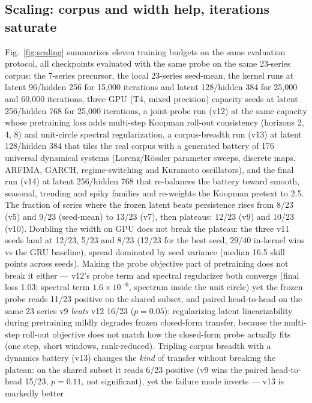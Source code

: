 \documentclass[11pt]{article}
\begin{document}
\subsection{Scaling: corpus and width help, iterations saturate}
\label{sec:scaling}
Fig.~\ref{fig:scaling} summarizes eleven training budgets on the same
evaluation protocol, all checkpoints evaluated with the same probe on the
same 23-series corpus: the 7-series precursor, the local 23-series
seed-mean, the kernel runs at latent 96/hidden 256 for 15{,}000
iterations and latent 128/hidden 384 for 25{,}000 and 60{,}000
iterations, three GPU (T4, mixed precision) capacity seeds at latent
256/hidden 768 for 25{,}000 iterations, a joint-probe run (v12) at
the same capacity whose pretraining loss adds multi-step Koopman
roll-out consistency (horizons 2, 4, 8) and unit-circle spectral
regularization, a corpus-breadth run (v13) at latent 128/hidden
384 that tiles the real corpus with a generated battery of 176
universal dynamical systems (Lorenz/R\"ossler parameter sweeps,
discrete maps, ARFIMA, GARCH, regime-switching and Kuramoto
oscillators), and the final run (v14) at latent 256/hidden 768 that
re-balances the battery toward smooth, seasonal, trending and spiky
families and re-weights the Koopman pretext to 2.5\texttimes.
The fraction of series where the frozen latent beats
persistence rises from 8/23 (v5) and 9/23 (seed-mean) to 13/23 (v7),
then plateaus: 12/23 (v9) and 10/23 (v10). Doubling the width on GPU
does not break the plateau: the three v11 seeds land at 12/23, 5/23 and
8/23 (12/23 for the best seed, 29/40 in-kernel wins vs the GRU
baseline), spread dominated by seed
variance (median 16.5 skill points across seeds). Making the probe
objective part of pretraining does not break it either --- v12's probe
term and spectral regularizer both converge (final loss 1.03; spectral
term $1.6\times10^{-6}$, spectrum inside the unit circle) yet the
frozen probe reads 11/23 positive on the shared subset, and paired
head-to-head on the same 23 series v9 \emph{beats} v12 16/23
($p=0.05$): regularizing latent linearizability during pretraining
mildly degrades frozen closed-form transfer, because the multi-step
roll-out objective does not match how the closed-form probe actually
fits (one step, short windows, rank-reduced). Tripling corpus breadth
with a dynamics battery (v13) changes the \emph{kind} of transfer
without breaking the plateau: on the shared subset it reads 6/23
positive (v9 wins the paired head-to-head 15/23, $p=0.11$, not
significant), yet the failure mode inverts --- v13 is markedly better
\end{document}
